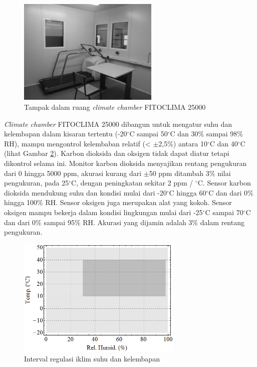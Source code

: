 \begin{figure}[!h]
	\centering
	\includegraphics[width=0.6\textwidth]{figures/ChamberTheory}
	\caption{Tampak dalam ruang \textit{climate chamber} FITOCLIMA 25000 \cite{paperChamber}}
	\label{fig:3:ChamberTheory}
\end{figure}

\textit{Climate chamber} FITOCLIMA 25000 dibangun untuk mengatur suhu dan kelembapan dalam kisaran tertentu (-20$^\circ$C sampai 50$^\circ$C dan 30\% sampai 98\% RH), mampu mengontrol kelembaban relatif (< $\pm$2,5\%) antara 10$^\circ$C dan 40$^\circ$C (lihat Gambar \ref{fig:3:TRHChamber}). Karbon dioksida dan oksigen tidak dapat diatur tetapi dikontrol selama ini. Monitor karbon dioksida menyajikan rentang pengukuran dari 0 hingga 5000 ppm, akurasi kurang dari $\pm$50 ppm ditambah 3\% nilai pengukuran, pada 25$^\circ$C, dengan peningkatan sekitar 2 ppm / $^\circ$C. Sensor karbon dioksida mendukung suhu dan kondisi mulai dari -20$^\circ$C hingga 60$^\circ$C dan dari 0\% hingga 100\% RH. Sensor oksigen juga merupakan alat yang kokoh. Sensor oksigen mampu bekerja dalam kondisi lingkungan mulai dari -25$^\circ$C sampai 70$^\circ$C dan dari 0\% sampai 95\% RH. Akurasi yang dijamin adalah 3\% dalam rentang pengukuran.

\begin{figure}[!h]
	\centering
	\includegraphics[width=0.7\textwidth]{figures/TRHChamber}
	\caption{Interval regulasi iklim suhu dan kelembapan \cite{paperChamber}}
	\label{fig:3:TRHChamber}
\end{figure}

